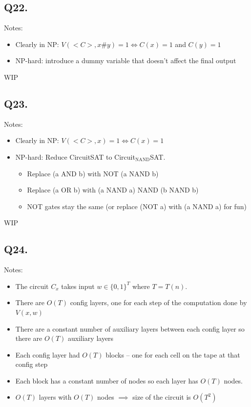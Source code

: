 \documentclass[letterpaper]{article}
\begin{document}
\subsection*{Q22.}

Notes:
\begin{itemize}
  \item Clearly in NP: $V(<C>,x\#y) = 1 \iff C(x) = 1$ and $C(y) = 1$
  \item NP-hard: introduce a dummy variable that doesn't affect the final output
\end{itemize}

WIP

\subsection*{Q23.}

Notes:
\begin{itemize}
  \item Clearly in NP: $V(<C>,x) = 1 \iff C(x) = 1$
  \item NP-hard: Reduce CircuitSAT to Circuit$_{\text{NAND}}$SAT.
        \begin{itemize}
          \item Replace (a AND b) with NOT (a NAND b)
          \item Replace (a OR b) with (a NAND a) NAND (b NAND b)
          \item NOT gates stay the same (or replace (NOT a) with (a NAND a) for fun)
        \end{itemize}
\end{itemize}

WIP

\subsection*{Q24.}

Notes:
\begin{itemize}
  \item The circuit $C_x$ takes input $w \in \{0,1\}^{T}$ where $T=T(n)$.
  \item There are $O(T)$ config layers, one for each step of the computation done by $V(x,w)$
  \item There are a constant number of auxiliary layers between each config
        layer so there are $O(T)$ auxiliary layers
  \item Each config layer had $O(T)$ blocks -- one for each cell on the tape at that config step
  \item Each block has a constant number of nodes so each layer has $O(T)$ nodes.
  \item $O(T)$ layers with $O(T)$ nodes $\implies$ size of the circuit is $O(T^2)$
\end{itemize}
\end{document}
